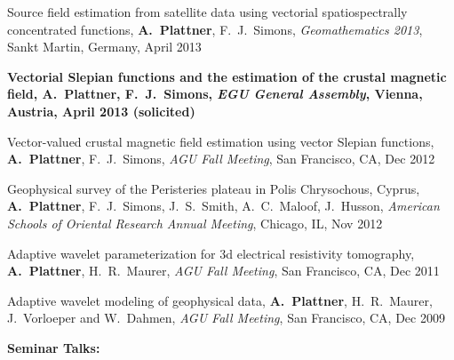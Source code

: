 \documentclass[10pt]{article}
\begin{document}
\spcp
Source field estimation from satellite data using vectorial spatiospectrally 
concentrated functions,
\textbf{A.~Plattner}, F.~J.~Simons,
\emph{Geomathematics 2013}, Sankt Martin, Germany, April 2013

\spcp
\textbf{Vectorial Slepian functions and the estimation of the crustal magnetic field,
A.~Plattner, F.~J.~Simons,
\emph{EGU General Assembly}, Vienna, Austria, April 2013 (solicited)}

\spcp
Vector-valued crustal magnetic field estimation using vector Slepian functions,
\textbf{A.~Plattner}, F.~J.~Simons,
\emph{AGU Fall Meeting}, San Francisco, CA, Dec 2012

\spcp
Geophysical survey of the Peristeries plateau in Polis Chrysochous, Cyprus,
\textbf{A.~Plattner}, F.~J.~Simons, J.~S.~Smith, A.~C.~Maloof, J.~Husson,
\emph{American Schools of Oriental Research Annual Meeting}, Chicago, IL, Nov 2012

\spcp
Adaptive wavelet parameterization for 3d electrical resistivity tomography,
\textbf{A.~Plattner}, H.~R.~Maurer, 
\emph{AGU Fall Meeting}, San Francisco, CA, Dec 2011

\spcp
Adaptive wavelet modeling of geophysical data,
\textbf{A.~Plattner}, H.~R.~Maurer, J.~Vorloeper and W.~Dahmen, 
\emph{AGU Fall Meeting}, San Francisco, CA, Dec 2009




\spc
\textbf{\tsize Seminar Talks:}
\end{document}
